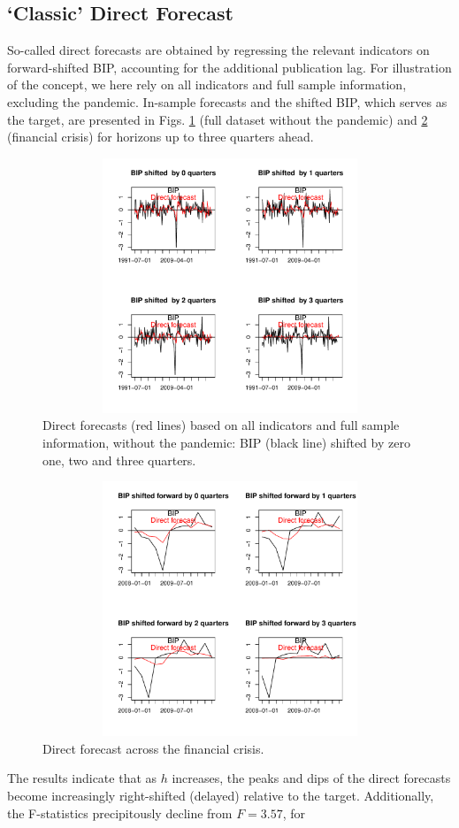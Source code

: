 \documentclass[a4paper]{article}
\begin{document}
\subsection{`Classic' Direct Forecast}\label{cdf}

So-called direct forecasts are obtained by regressing the relevant indicators on forward-shifted BIP, accounting for the additional publication lag. For illustration of the concept, we here rely on all indicators and full sample information, excluding the pandemic. In-sample forecasts and the shifted BIP, which serves as the target, are presented in Figs. \ref{direct_wc} (full dataset without the pandemic) and \ref{direct_wc_financial_crisis} (financial crisis) for horizons up to three quarters ahead. 
\begin{figure}[H]\begin{center}\includegraphics[height=3in, width=4.5in]{./Figures/direct_wc_all.pdf}\caption{Direct forecasts (red lines) based on all indicators and full sample information, without the pandemic: BIP (black line) shifted by zero one, two and three quarters.\label{direct_wc}}\end{center}\end{figure}\begin{figure}[H]\begin{center}\includegraphics[height=3in, width=4.5in]{./Figures/direct_wc_financial_crisis.pdf}\caption{Direct forecast  across the financial crisis.\label{direct_wc_financial_crisis}}\end{center}\end{figure}The results indicate that as $h$ increases, the peaks and dips of the direct forecasts become increasingly right-shifted (delayed) relative to the target. Additionally, the F-statistics precipitously decline from $F=3.57$, for 
\end{document}
